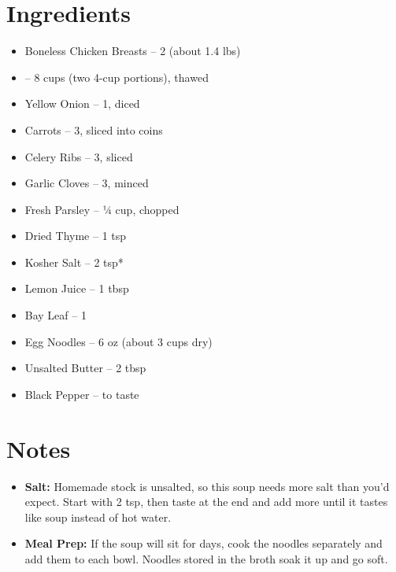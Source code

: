 




\section*{Ingredients}

\begin{itemize}
      \item Boneless Chicken Breasts – 2 (about 1.4 lbs)
      \item {} – 8 cups (two 4-cup portions), thawed
      \item[\cut] Yellow Onion – 1, diced
      \item[\cut] Carrots – 3, sliced into coins
      \item[\cut] Celery Ribs – 3, sliced
      \item[\cut] Garlic Cloves – 3, minced
      \item[\cut] Fresh Parsley – ¼ cup, chopped
      \item[\measure] Dried Thyme – 1 tsp
      \item[\measure] Kosher Salt – 2 tsp*
      \item[\measure] Lemon Juice – 1 tbsp
      \item Bay Leaf – 1
      \item Egg Noodles – 6 oz (about 3 cups dry)
      \item Unsalted Butter – 2 tbsp
      \item Black Pepper – to taste
\end{itemize}

\section*{Notes}

\begin{itemize}
      \item[*] \textbf{Salt:} Homemade stock is unsalted, so this soup needs more salt than you'd expect. Start with 2 tsp, then taste at the end and add more until it tastes like soup instead of hot water.
      \item \textbf{Meal Prep:} If the soup will sit for days, cook the noodles separately and add them to each bowl. Noodles stored in the broth soak it up and go soft.
\end{itemize}

